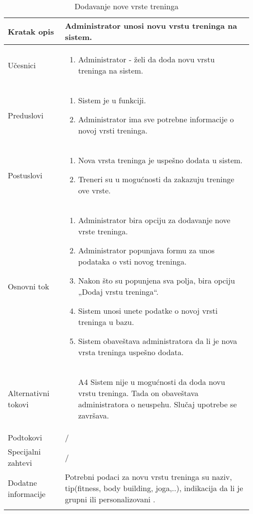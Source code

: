 \documentclass[../main.tex]{subfiles}
\begin{document}
\begin{longtable}{| p{} | p{} |} 

\hline
    Kratak opis &  Administrator unosi novu vrstu treninga na sistem.\\ 
\hline    
    Učesnici & 
    	\begin{enumerate}
        \item Administrator - želi da doda novu vrstu treninga na sistem.
     \end{enumerate}\\
\hline
   Preduslovi & \begin{enumerate}
       \item Sistem je u funkciji.
       \item Administrator ima sve potrebne informacije o novoj vrsti treninga.
   \end{enumerate}\\
\hline  
    Postuslovi & \begin{enumerate}
        \item Nova vrsta treninga je uspešno dodata u sistem.
        \item Treneri su u mogućnosti da zakazuju treninge ove vrste.
    \end{enumerate}\\
\hline
    Osnovni tok & \begin{enumerate}
        \item Administrator bira opciju za dodavanje nove vrste treninga.
        \item Administrator popunjava formu za unos podataka o vsti novog treninga.
        \item Nakon što su popunjena sva polja, bira opciju „Dodaj vrstu treninga“.
        \item Sistem unosi unete podatke o novoj vrsti treninga u bazu.
        \item Sistem obaveštava administratora da li je nova vrsta treninga uspešno dodata.
    \end{enumerate}\\
\hline
    Alternativni tokovi & \begin{itemize}
        \item[A4]  Sistem nije u mogućnosti da doda novu vrstu treninga. Tada on obaveštava administratora o neuspehu. Slučaj upotrebe se završava.

    \end{itemize}\\
\hline
    Podtokovi & /\\
\hline
    Specijalni zahtevi & /\\
\hline
    Dodatne informacije & Potrebni podaci za novu vrstu treninga su naziv, tip(fitness, body building, joga,..), indikacija da li je grupni ili personalizovani .\\
\hline
\caption{Dodavanje nove vrste treninga} %
\end{longtable}
\end{document}
